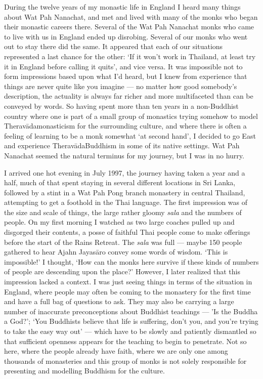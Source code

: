 During the twelve years of my monastic life in England I heard many
things about Wat Pah Nanachat, and met and lived with many of the monks
who began their monastic careers there. Several of the Wat Pah Nanachat
monks who came to live with us in England ended up disrobing. Several of
our monks who went out to stay there did the same. It appeared that each
of our situations represented a last chance for the other: `If it won't
work in Thailand, at least try it in England before calling it quits',
and vice versa. It was impossible not to form impressions based upon
what I'd heard, but I knew from experience that things are never quite
like you imagine --- no matter how good somebody's description, the
actuality is always far richer and more multifaceted than can be
conveyed by words. So having spent more than ten years in a non-Buddhist
country where one is part of a small group of monastics trying somehow
to model Theravāda‎monasticism for the surrounding culture, and where
there is often a feeling of learning to be a monk somewhat `at second
hand', I decided to go East and experience Theravāda‎Buddhism in some of
its native settings. Wat Pah Nanachat seemed the natural terminus for my
journey, but I was in no hurry.

I arrived one hot evening in July 1997, the journey having taken a year
and a half, much of that spent staying in several different locations in
Sri Lanka, followed by a stint in a Wat Pah Pong branch monastery in
central Thailand, attempting to get a foothold in the Thai language. The
first impression was of the size and scale of things, the large rather
gloomy \emph{sala} and the numbers of people. On my first morning I
watched as two large coaches pulled up and disgorged their contents, a
posse of faithful Thai people come to make offerings before the start of
the Rains Retreat. The \emph{sala} was full --- maybe 150 people
gathered to hear Ajahn Jayasāro convey some words of wisdom. `This is
impossible!' I thought, `How can the monks here survive if these kinds
of numbers of people are descending upon the place?' However, I later
realized that this impression lacked a context. I was just seeing things
in terms of the situation in England, where people may often be coming
to the monastery for the first time and have a full bag of questions to
ask. They may also be carrying a large number of inaccurate
preconceptions about Buddhist teachings --- 'Is the Buddha a God?'; `You
Buddhists believe that life is suffering, don't you, and you're trying
to take the easy way out' --- which have to be slowly and patiently
dismantled so that sufficient openness appears for the teaching to begin
to penetrate. Not so here, where the people already have faith, where we
are only one among thousands of monasteries and this group of monks is
not solely responsible for presenting and modelling Buddhism for the
culture.

